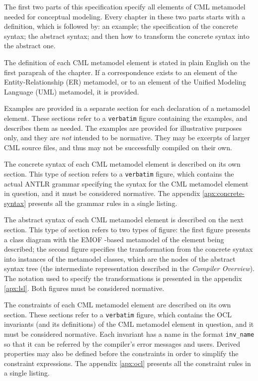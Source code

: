 The first two parts of this specification specify all elements of CML metamodel
needed for conceptual modeling.
Every chapter in these two parts starts with a definition,
which is followed by: an example;
the specification of the concrete syntax;
the abstract syntax;
and then how to transform the concrete syntax into the abstract one.

The definition of each CML metamodel element is stated in plain English
on the first paraprah of the chapter.
If a correspondence exists to an element of
the Entity-Relationship (ER) \cite{er} metamodel,
or to an element of the Unified Modeling Language (UML) \cite{uml} metamodel,
it is provided.

Examples are provided in a separate section
for each declaration of a metamodel element.
These sections refer to a \verb+verbatim+ figure containing the examples,
and describes them as needed.
The examples are provided for illustrative purposes only,
and they are \emph{not} intended to be normative.
They may be excerpts of larger CML source files,
and thus may not be successfully compiled on their own.

The concrete syntax of each CML metamodel element is described
on its own section.
This type of section refers to a \verb+verbatim+ figure,
which contains the actual ANTLR \cite{antlr} grammar
specifying the syntax for the CML metamodel element in question,
and it must be considered normative.
The appendix \ref{apx:concrete-syntax} presents all the grammar rules
in a single listing.

The abstract syntax of each CML metamodel element is described
on the next section.
This type of section refers to two types of figure:
the first figure presents a class diagram
with the EMOF \cite{mof}-based metamodel
of the element being described;
the second figure specifies the transformation
from the concrete syntax into instances of the metamodel classes,
which are the nodes of the abstract syntax tree
(the intermediate representation described in the \emph{Compiler Overview}).
The notation used to specify the transformations is presented
in the appendix \ref{apx:lsl}.
Both figures must be considered normative.

The constraints of each CML metamodel element are described
on its own section.
These sections refer to a \verb+verbatim+ figure,
which contains the OCL \cite{ocl} invariants
(and its definitions)
of the CML metamodel element in question,
and it must be considered normative.
Each invariant has a name in the format \verb+inv_name+
so that it can be referred by the compiler's error messages
and users.
Derived properties may also be defined before the constraints
in order to simplify the constraint expressions.
The appendix \ref{apx:ocl} presents all the constraint rules
in a single listing.

